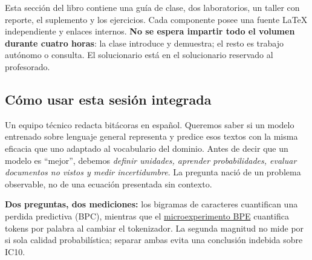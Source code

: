 
\begin{idea}
Esta sección del libro contiene una guía de clase, dos laboratorios, un taller con
reporte, el suplemento y los ejercicios. Cada componente posee una fuente
LaTeX independiente y enlaces internos. \textbf{No se espera impartir todo
el volumen durante cuatro horas}: la clase introduce y demuestra; el resto
es trabajo autónomo o consulta. El solucionario está en el solucionario reservado al profesorado.
\end{idea}



\subsection{Cómo usar esta sesión integrada}
\label{s01:mod:ruta}
\begin{idea}
Un equipo técnico redacta bitácoras en español. Queremos saber si un modelo entrenado
sobre lenguaje general representa y predice esos textos con la misma eficacia que uno
adaptado al vocabulario del dominio. Antes de decir que un modelo es ``mejor'', debemos
\emph{definir unidades, aprender probabilidades, evaluar documentos no vistos y medir incertidumbre}.
La pregunta nació de un problema observable, no de una ecuación presentada sin contexto.
\end{idea}
\begin{center}
\end{center}
\noindent\textbf{Dos preguntas, dos mediciones:} los bigramas de caracteres
cuantifican una perdida predictiva (BPC), mientras que el
\hyperref[s01:lab:ic10]{microexperimento BPE} cuantifica tokens por palabra
al cambiar el tokenizador. La segunda magnitud no mide por si sola calidad
probabilística; separar ambas evita una conclusión indebida sobre IC10.


